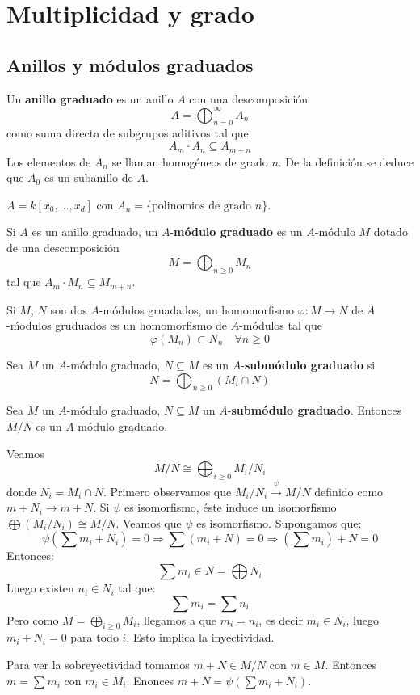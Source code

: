 \documentclass[ACGA.tex]{subfiles}
\begin{document}
\chapter{Multiplicidad y grado}

\section{Anillos y módulos graduados}
\begin{defi}
Un \textbf{anillo graduado} es un anillo $A$ con una descomposición 
\[ A = \bigoplus_{n=0}^{∞} A_n \]
como suma directa de subgrupos aditivos tal que:
\[ A_m \cdot A_n \subseteq A_{m+n} \]
Los elementos de $A_n$ se llaman homogéneos de grado $n$. De la definición se deduce que $A_0$ es un subanillo de $A$.
\end{defi}

\begin{ej}
$A = k[x_0,\dots,x_d]$ con $A_n = \{\text{polinomios de grado }n\}$.
\end{ej}

\begin{defi}
Si $A$ es un anillo graduado, un $A$-\textbf{módulo graduado} es un $A$-módulo $M$ dotado de una descomposición
\[ M = \bigoplus_{n≥0} M_n \]
tal que $A_m \cdot M_n \subseteq M_{m+n}$.
\end{defi}

\begin{defi}
Si $M$, $N$ son dos $A$-módulos gruadados, un homomorfismo $φ : M \to N$ de $A$-ḿodulos gruduados es un homomorfismo de $A$-módulos tal que
\[ φ(M_n) \subset N_n \quad \forall n ≥ 0 \]
\end{defi}

\begin{defi}
Sea $M$ un $A$-módulo graduado, $N \subseteq M$ es un $A$-\textbf{submódulo graduado} si
\[ N = \bigoplus_{n≥0} (M_i \cap N) \]
\end{defi}

\begin{teorema}
Sea $M$ un $A$-módulo graduado, $N \subseteq M$ un $A$-\textbf{submódulo graduado}. Entonces $M/N$ es un $A$-módulo graduado. 
\end{teorema}
\begin{dem}
Veamos
\[ M/N \cong \bigoplus_{i≥0} M_i / N_i \]
donde $N_i = M_i \cap N$. Primero observamos que $M_i/N_i \xrightarrow{ψ} M/N$ definido como $m + N_i \to m+N$. Si $ψ$ es isomorfismo, éste induce un isomorfismo $\bigoplus (M_i/N_i) \cong M/N$. Veamos que $ψ$ es isomorfismo. Supongamos que:
\[ ψ\left(\sum m_i + N_i\right) = 0 \Rightarrow  \sum \left(m_i + N\right) = 0 \Rightarrow  \left(\sum m_i\right) + N = 0\]
Entonces:
\[ \sum m_i \in N = \bigoplus N_i \]
Luego existen $n_i \in N_i$ tal que:
\[ \sum m_i = \sum n_i\]
Pero como $M = \bigoplus_{i≥0} M_i$, llegamos a que $m_i = n_i$, es decir $m_i \in N_i$, luego $m_i + N_i = 0$ para todo $i$. Esto implica la inyectividad.

Para ver la sobreyectividad tomamos $m+N \in M/N$ con $m \in M$. Entonces $m = \sum m_i$ con $m_i \in M_i$. Enonces $m+N = ψ\left(\sum m_i + N_i\right)$.
\end{dem}
\end{document}
